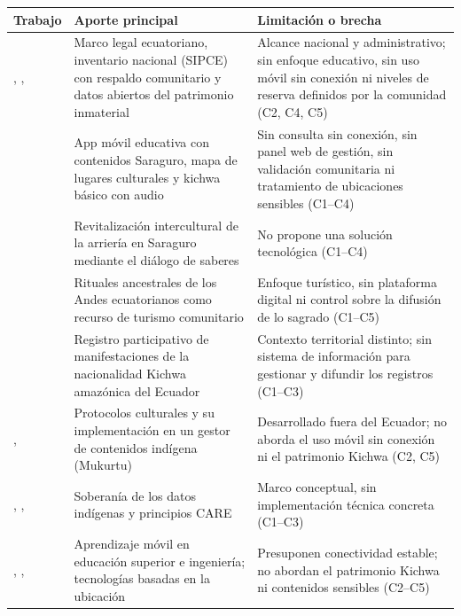 {\centering\singlespacing
  \label{tab:estado_arte}
  \begin{tabular}{|p{}|p{}|p{}|}
    \hline
    \textbf{Trabajo} & \textbf{Aporte principal} & \textbf{Limitación o brecha} \tabularnewline
    \hline
    \raggedright \cite{ecuador2016cultura}, \cite{inpc2026sipce}, \cite{inpc2025datos} & \raggedright Marco legal ecuatoriano, inventario nacional (SIPCE) con respaldo comunitario y datos abiertos del patrimonio inmaterial & \raggedright Alcance nacional y administrativo; sin enfoque educativo, sin uso móvil sin conexión ni niveles de reserva definidos por la comunidad (C2, C4, C5) \tabularnewline
    \hline
    \raggedright \cite{quezada2026mobile} & \raggedright App móvil educativa con contenidos Saraguro, mapa de lugares culturales y kichwa básico con audio & \raggedright Sin consulta sin conexión, sin panel web de gestión, sin validación comunitaria ni tratamiento de ubicaciones sensibles (C1--C4) \tabularnewline
    \hline
    \raggedright \cite{quezada2026muleteering} & \raggedright Revitalización intercultural de la arriería en Saraguro mediante el diálogo de saberes & \raggedright No propone una solución tecnológica (C1--C4) \tabularnewline
    \hline
    \raggedright \cite{torres2022ancestral} & \raggedright Rituales ancestrales de los Andes ecuatorianos como recurso de turismo comunitario & \raggedright Enfoque turístico, sin plataforma digital ni control sobre la difusión de lo sagrado (C1--C5) \tabularnewline
    \hline
    \raggedright \cite{maldonado2021kichwa} & \raggedright Registro participativo de manifestaciones de la nacionalidad Kichwa amazónica del Ecuador & \raggedright Contexto territorial distinto; sin sistema de información para gestionar y difundir los registros (C1--C3) \tabularnewline
    \hline
    \raggedright \cite{christen2012information}, \cite{christen2017mukurtu} & \raggedright Protocolos culturales y su implementación en un gestor de contenidos indígena (Mukurtu) & \raggedright Desarrollado fuera del Ecuador; no aborda el uso móvil sin conexión ni el patrimonio Kichwa (C2, C5) \tabularnewline
    \hline
    \raggedright \cite{kukutai2016indigenous}, \cite{hudson2023indigenous}, \cite{carroll2020care} & \raggedright Soberanía de los datos indígenas y principios CARE & \raggedright Marco conceptual, sin implementación técnica concreta (C1--C3) \tabularnewline
    \hline
    \raggedright \cite{sarrab2012mobile}, \cite{peramunugamage2023engineering}, \cite{gretzel2015smart} & \raggedright Aprendizaje móvil en educación superior e ingeniería; tecnologías basadas en la ubicación & \raggedright Presuponen conectividad estable; no abordan el patrimonio Kichwa ni contenidos sensibles (C2--C5) \tabularnewline
    \hline
  \end{tabular}\par}

